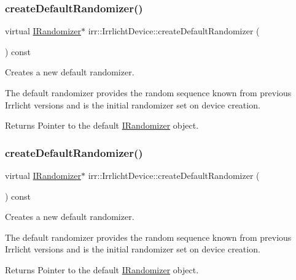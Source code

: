 \subsubsection{\texorpdfstring{create\+Default\+Randomizer()}{createDefaultRandomizer()}\hspace{0.1cm}{\footnotesize\ttfamily [1/2]}}
{\footnotesize\ttfamily virtual \hyperlink{classirr_1_1IRandomizer}{I\+Randomizer}$\ast$ irr\+::\+Irrlicht\+Device\+::create\+Default\+Randomizer (\begin{DoxyParamCaption}{ }\end{DoxyParamCaption}) const\hspace{0.3cm}{\ttfamily [pure virtual]}}



Creates a new default randomizer. 

The default randomizer provides the random sequence known from previous Irrlicht versions and is the initial randomizer set on device creation. \begin{DoxyReturn}{Returns}
Pointer to the default \hyperlink{classirr_1_1IRandomizer}{I\+Randomizer} object. 
\end{DoxyReturn}
\mbox{\label{classirr_1_1IrrlichtDevice_a267b069ea2c5f5b008fd7afa5b931ee9}} 
\subsubsection{\texorpdfstring{create\+Default\+Randomizer()}{createDefaultRandomizer()}\hspace{0.1cm}{\footnotesize\ttfamily [2/2]}}
{\footnotesize\ttfamily virtual \hyperlink{classirr_1_1IRandomizer}{I\+Randomizer}$\ast$ irr\+::\+Irrlicht\+Device\+::create\+Default\+Randomizer (\begin{DoxyParamCaption}{ }\end{DoxyParamCaption}) const\hspace{0.3cm}{\ttfamily [pure virtual]}}



Creates a new default randomizer. 

The default randomizer provides the random sequence known from previous Irrlicht versions and is the initial randomizer set on device creation. \begin{DoxyReturn}{Returns}
Pointer to the default \hyperlink{classirr_1_1IRandomizer}{I\+Randomizer} object. 
\end{DoxyReturn}
\mbox{\label{classirr_1_1IrrlichtDevice_a9dccd3d7af7cfbabee46214a89bd6650}} 
